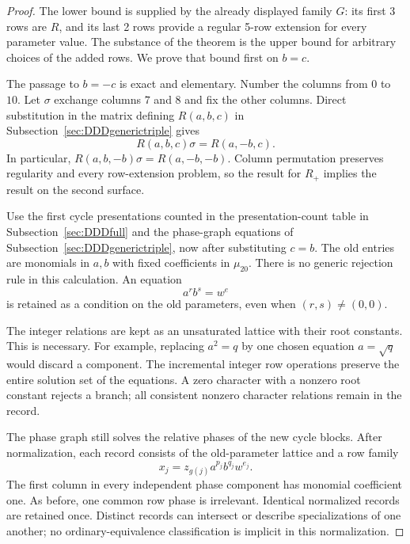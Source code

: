 \documentclass[11pt,a4paper]{article}
\theoremstyle{plain}
\theoremstyle{definition}
\theoremstyle{plain}
\begin{document}
\begin{proof}
The lower bound is supplied by the already displayed family $G$: its first 3 rows are $R$, and its last 2 rows provide a regular 5-row extension for every parameter value. The substance of the theorem is the upper bound for arbitrary choices of the added rows. We prove that bound first on $b=c$.

The passage to $b=-c$ is exact and elementary. Number the columns from $0$ to $10$. Let $\sigma$ exchange columns $7$ and $8$ and fix the other columns. Direct substitution in the matrix defining $R(a,b,c)$ in Subsection~\ref{sec:DDDgenerictriple} gives
\[
R(a,b,c)\sigma=R(a,-b,c).
\]
In particular, $R(a,b,-b)\sigma=R(a,-b,-b)$. Column permutation preserves regularity and every row-extension problem, so the result for $R_+$ implies the result on the second surface.

\medskip
Use the first cycle presentations counted in the presentation-count table in Subsection~\ref{sec:DDDfull} and the phase-graph equations of Subsection~\ref{sec:DDDgenerictriple}, now after substituting $c=b$. The old entries are monomials in $a,b$ with fixed coefficients in $\mu_{20}$. There is no generic rejection rule in this calculation. An equation
\[
a^r b^s=w^{e}
\]
is retained as a condition on the old parameters, even when $(r,s)\ne(0,0)$.

The integer relations are kept as an unsaturated lattice with their root constants. This is necessary. For example, replacing $a^2=q$ by one chosen equation $a=\sqrt q$ would discard a component. The incremental integer row operations preserve the entire solution set of the equations. A zero character with a nonzero root constant rejects a branch; all consistent nonzero character relations remain in the record.

The phase graph still solves the relative phases of the new cycle blocks. After normalization, each record consists of the old-parameter lattice and a row family
\[
x_j=z_{g(j)}a^{p_j}b^{q_j}w^{e_j}.
\]
The first column in every independent phase component has monomial coefficient one. As before, one common row phase is irrelevant. Identical normalized records are retained once. Distinct records can intersect or describe specializations of one another; no ordinary-equivalence classification is implicit in this normalization.


\end{proof}
\end{document}
